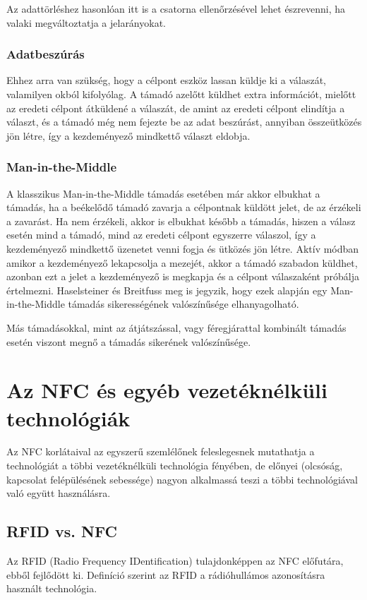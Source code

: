 \documentclass[12pt]{article}
\begin{document}
Az adattörléshez hasonlóan itt is a csatorna ellenőrzésével lehet észrevenni,
ha valaki megváltoztatja a jelarányokat.

\subsubsection{Adatbeszúrás}
Ehhez arra van szükség, hogy a célpont eszköz lassan küldje ki a válaszát, 
valamilyen okból kifolyólag. A támadó azelőtt küldhet extra információt, mielőtt
az eredeti célpont átküldené a válaszát, de amint az eredeti célpont elindítja a
választ, és a támadó még nem fejezte be az adat beszúrást, annyiban összeütközés
jön létre, így a kezdeményező mindkettő választ eldobja.

\subsubsection{Man-in-the-Middle}
A klasszikus Man-in-the-Middle támadás esetében már akkor elbukhat
a támadás, ha a beékelődő támadó zavarja a célpontnak küldött jelet, de az
érzékeli a zavarást. Ha nem érzékeli, akkor is elbukhat később a támadás, 
hiszen a válasz esetén mind a támadó, mind az eredeti célpont egyszerre válaszol,
így a kezdeményező mindkettő üzenetet venni fogja és ütközés jön létre.
Aktív módban amikor a kezdeményező lekapcsolja a mezejét, akkor a támadó szabadon
küldhet, azonban ezt a jelet a kezdeményező is megkapja és a célpont válaszaként
próbálja értelmezni. Haselsteiner és Breitfuss meg is jegyzik, hogy ezek alapján
egy Man-in-the-Middle támadás sikerességének valószínűsége elhanyagolható.

Más támadásokkal, mint az átjátszással, vagy féregjárattal kombinált támadás
esetén viszont megnő a támadás sikerének valószínűsége.

\section{Az NFC és egyéb vezetéknélküli technológiák}
Az NFC korlátaival az egyszerű szemlélőnek feleslegesnek mutathatja a 
technológiát a többi vezetéknélküli technológia fényében, de előnyei 
(olcsóság, kapcsolat felépülésének sebessége)
nagyon alkalmassá teszi a többi technológiával való együtt használásra.

\subsection{RFID vs. NFC}
Az RFID (Radio Frequency IDentification) tulajdonképpen az NFC előfutára, ebből
fejlődött ki. Definíció szerint az RFID a rádióhullámos azonosításra használt technológia.
\end{document}
